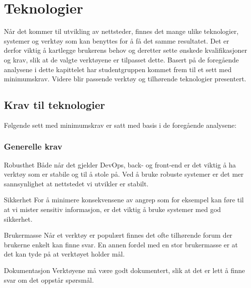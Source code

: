 \section{Teknologier}
\label{sec:technologies}
Når det kommer til utvikling av nettsteder, finnes det mange ulike teknologier, systemer og verktøy som kan benyttes for å få det samme resultatet. Det er derfor viktig å kartlegge brukerens behov og deretter sette ønskede kvalifikasjoner og krav, slik at de valgte verktøyene er tilpasset dette. Basert på de foregående analysene i dette kapittelet har studentgruppen kommet frem til et sett med minimumskrav. Videre blir passende verktøy og tilhørende teknologier presentert.

\subsection{Krav til teknologier}
Følgende sett med minimumskrav er satt med basis i de foregående analysene:

\subsubsection{Generelle krav}

\begin{compactdesc}
\item [Robusthet] Både når det gjelder DevOps, back- og front-end er det viktig å ha verktøy som er stabile og til å stole på. Ved å bruke robuste systemer er det mer sannsynlighet at nettstedet vi utvikler er stabilt.
\item [Sikkerhet] For å minimere konsekvensene av angrep som for eksempel kan føre til at vi mister sensitiv informasjon, er det viktig å bruke systemer med god sikkerhet.
\item [Brukermasse] Når et verktøy er populært finnes det ofte tilhørende forum der brukerne enkelt kan finne svar. En annen fordel med en stor brukermasse er at det kan tyde på at verktøyet holder mål.
\item [Dokumentasjon] Verktøyene må være godt dokumentert, slik at det er lett å finne svar om det oppstår spørsmål.
\end{compactdesc}

